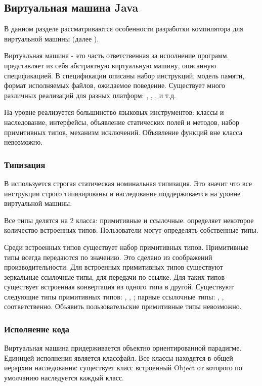 \subsection{Виртуальная машина Java}
В данном разделе рассматриваются особенности разработки компилятора для виртуальной машины (далее ).

Виртуальная машина  - это часть  ответственная за исполнение программ.  представляет из себя абстрактную виртуальную машину, описанную спецификацией\cite{jvm:specification}. В спецификации описаны набор инструкций, модель памяти, формат исполняемых файлов, ожидаемое поведение. Существует много различных реализаций  для разных платформ: , , ,  и т.д.

На уровне  реализуется большинство языковых инструментов: классы и наследование, интерфейсы, объявление статических полей и методов, набор примитивных типов, механизм исключений. Объявление функций вне класса невозможно.

\subsubsection{Типизация}
В  используется строгая статическая номинальная типизация. Это значит что все инструкции строго типизированы и наследование поддерживается на уровне виртуальной машины.

Все типы делятся на 2 класса: примитивные и ссылочные.  определяет некоторое количество встроенных типов. Пользователи могут определять собственные типы.

Среди встроенных типов существует набор примитивных типов. Примитивные типы всегда передаются по значению. Это сделано из соображений производительности. Для встроенных примитивных типов существуют зеркальные ссылочные типы, для передачи по ссылке. Для таких типов существует встроенная конвертация из одного типа в другой. Существуют следующие типы примитивных типов: , , ; парные ссылочные типы: , ,  соответственно. Объявить пользовательские примитивные типы невозможно.

\subsubsection{Исполнение кода}
Виртуальная машина  придерживается объектно ориентированной парадигме. Единицей исполнения является классфайл. Все классы находятся в общей иерархии наследования: существует класс встроенный Object от которого по умолчанию наследуется каждый класс.

